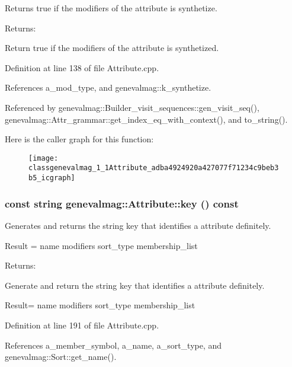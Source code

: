 Returns true if the modifiers of the attribute is synthetize. \begin{Desc}
\item[Returns:]\end{Desc}
Return true if the modifiers of the attribute is synthetized. 

Definition at line 138 of file Attribute.cpp.

References a\_\-mod\_\-type, and genevalmag::k\_\-synthetize.

Referenced by genevalmag::Builder\_\-visit\_\-sequences::gen\_\-visit\_\-seq(), genevalmag::Attr\_\-grammar::get\_\-index\_\-eq\_\-with\_\-context(), and to\_\-string().

Here is the caller graph for this function:\nopagebreak
\begin{figure}[H]
\begin{center}
\leavevmode
\texttt{[image: classgenevalmag\_1\_1Attribute\_adba4924920a427077f71234c9beb3b5\_icgraph]}
\end{center}
\end{figure}
\hypertarget{classgenevalmag_1_1Attribute_6692cef1261bf52199e8fbc81c15f010}{
\subsubsection[{key}]{\setlength{\rightskip}{0pt plus 5cm}const string genevalmag::Attribute::key () const}}
\label{classgenevalmag_1_1Attribute_6692cef1261bf52199e8fbc81c15f010}


Generates and returns the string key that identifies a attribute definitely.\par
 \par
 Result = name modifiers sort\_\-type membership\_\-list\par


\begin{Desc}
\item[Returns:]\end{Desc}
Generate and return the string key that identifies a attribute definitely.

Result= name modifiers sort\_\-type membership\_\-list 

Definition at line 191 of file Attribute.cpp.

References a\_\-member\_\-symbol, a\_\-name, a\_\-sort\_\-type, and genevalmag::Sort::get\_\-name().

